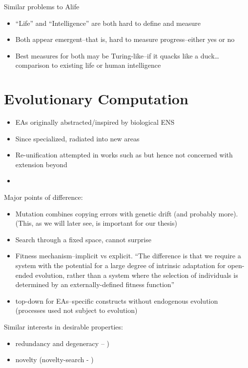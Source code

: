 Similar problems to Alife

\begin{itemize}
	\item
	      ``Life'' and ``Intelligence'' are both hard to define and measure
	\item
	      Both appear emergent--that is, hard to measure progress--either yes
	      or no
	\item
	      Best measures for both may be Turing-like--if it quacks like a
	      duck\ldots{}comparison to existing life or human intelligence
\end{itemize}

\section{Evolutionary Computation}

\begin{itemize}
	\item
	      EAs originally abstracted/inspired by biological ENS
	\item
	      Since specialized, radiated into new areas
	\item
	      Re-unification attempted in works such as \autocite{Paixao2015} but hence not concerned with extension beyond 
	\item
\end{itemize}

Major points of difference:

\begin{itemize}
	\item
	      Mutation combines copying errors with genetic drift (and probably more). (This, as we will later see, is important for our thesis)
	\item
	      Search through a fixed space, cannot surprise \eg \autocite{Nellis2014}
	\item
	      Fitness mechanism--implicit vs explicit.  ``The
	      difference is that we require a system with the potential for a
	      large degree of intrinsic adaptation for open-ended evolution,
	      rather than a system where the selection of individuals is
	      determined by an externally-defined fitness function'' \autocite{Taylor2001}
	\item
	      top-down for EAs--specific constructs without endogenous evolution (processes used not subject to evolution)
\end{itemize}

Similar interests in desirable properties:

\begin{itemize}
	\item redundancy and degeneracy -- \autocite{Whitacre:2010qy})
	\item novelty (novelty-search - \autocite{Lehman:2008cr})
\end{itemize}
